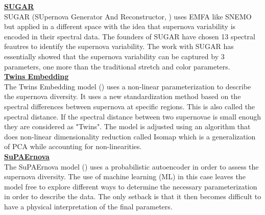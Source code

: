 \noindent \textbf{\underline{SUGAR}} \\

SUGAR (SUpernova Generator And Reconstructor, \cite{L_get_2020_SUGAR}) uses EMFA like SNEMO but applied in a different space with the idea that
supernova variability is encoded in their spectral data. The founders of SUGAR have chosen 13 spectral feautres to identify the supernova variability. The work
with SUGAR has essentially showed that the supernova variability can be captured by 3 parameters, one more than the traditional stretch and color parameters. \\

\noindent \textbf{\underline{Twins Embedding}} \\

The Twins Embedding model (\cite{Boone_2021_twins_embedding}) uses a non-linear parameterization to describe the supernova diversity. It uses a new standardization
method based on the spectral differences between supernova at specific regions. This is also called the spectral distance. If the spectral distance between two supernovae is
small enough they are considered as "Twins". The model is adjusted using an algorithm that does non-linear dimensionality reduction called Isomap which is a generalization of 
PCA while accounting for non-linearities. \\

\noindent \textbf{\underline{SuPAErnova}} \\

The SuPAErnova model (\cite{Stein_2022_PAE}) uses a probabilistic autoencoder in order to assess the supernova diversity. The use of machine learning (ML) in this case 
leaves the model free to explore different ways to determine the necessary parameterization in order to describe the data. The only setback is that it then becomes difficult
to have a physical interpretation of the final parameters. \\